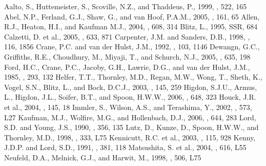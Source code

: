 \documentclass[manuscript]{aastex}
\begin{document}
\begin{thebibliography}{}
 Aalto, S., Huttemeister, S., Scoville, N.Z., and Thaddeus, P., 1999, \aj, 522, 165
 Abel, N.P., Ferland, G.J., Shaw, G., and van Hoof, P.A.M., 2005, \apjs, 161, 65
 Allen, R.J., Heaton, H.I., and Kaufman M.J., 2004, \apj, 608, 314
 Blitz, L., 1995, SSR, 684
 Calzetti, D. et al., 2005, \apj, 633, 871
 Carpenter, J.M. and Sanders, D.B., 1998, \aj, 116, 1856
 Crane, P.C. and van der Hulst, J.M., 1992, \aj, 103, 1146
 Dewangn, G.C., Griffiths, R.E., Choudhury, M., Miyaji, T., and Schurch, N.J., 2005, \apj, 635, 198
 Ford, H.C., Crane, P.C., Jacoby, G.H., Lawrie, D.G., and van der Hulst, J.M., 1985, \apj, 293, 132
 Helfer, T.T., Thornley, M.D., Regan, M.W., Wong, T., Sheth, K., Vogel, S.N., Blitz, L., and Bock, D.C.J., 2003, \apjs, 145, 259
 Higdon, S.J.U., Armus, L., Higdon, J.L., Soifer, B.T., and Spoon, H.W.W., 2006, \apj, 648, 323
 Houck, J.R. et al., 2004, \apjs, 145, 18
 Immler, S., Wilson, A.S., and Terashima, Y., 2002, \apj, 573, L27
 Kaufman, M.J., Wolfire, M.G., and Hollenbach, D.J., 2006, \apj, 644, 283 
 Lord, S.D. and Young, J.S., 1990, \apj, 356, 135
 Lutz, D., Kunze, D., Spoon, H.W.W., and Thornley, M.D., 1998, \aap, 333, L75
 Kennicutt, R.C. et al., 2003, \pasp, 115, 928
 Kenny, J.D.P. and Lord, S.D., 1991, \apj, 381, 118
 Matsushita, S. et al., 2004, \apj, 616, L55
 Neufeld, D.A., Melnick, G.J., and Harwit, M., 1998, \apj, 506, L75

\end{thebibliography}
\end{document}
